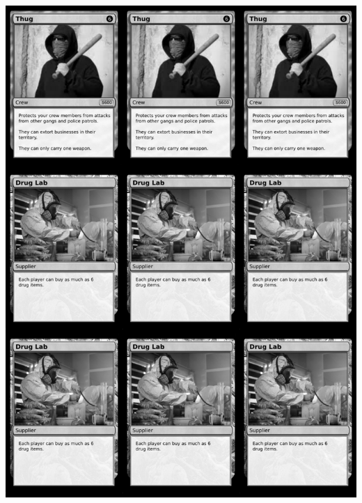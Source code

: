 \documentclass[a4paper]{article}
\begin{document}
\begin{center}
	\centering
	\includegraphics[width=190.5mm,height=266.7mm]{output/temp/page19.png}
\end{center}

\newpage
\end{document}
